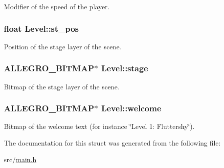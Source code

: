 Modifier of the speed of the player. \hypertarget{structLevel_ab13f799d9e2e06a04debbd97676fb512}{
\subsubsection[{st\-\_\-pos}]{\setlength{\rightskip}{0pt plus 5cm}float Level\-::st\-\_\-pos}}\label{structLevel_ab13f799d9e2e06a04debbd97676fb512}
Position of the stage layer of the scene. \hypertarget{structLevel_ad412b858a4e688114dd89a44ecb005bb}{
\subsubsection[{stage}]{\setlength{\rightskip}{0pt plus 5cm}A\-L\-L\-E\-G\-R\-O\-\_\-\-B\-I\-T\-M\-A\-P$\ast$ Level\-::stage}}\label{structLevel_ad412b858a4e688114dd89a44ecb005bb}
Bitmap of the stage layer of the scene. \hypertarget{structLevel_a575fec7686bd94b5c35b15d73296c977}{
\subsubsection[{welcome}]{\setlength{\rightskip}{0pt plus 5cm}A\-L\-L\-E\-G\-R\-O\-\_\-\-B\-I\-T\-M\-A\-P$\ast$ Level\-::welcome}}\label{structLevel_a575fec7686bd94b5c35b15d73296c977}
Bitmap of the welcome text (for instance \char`\"{}\-Level 1\-: Fluttershy\char`\"{}). 

The documentation for this struct was generated from the following file\-:\begin{DoxyCompactItemize}
\item 
src/\hyperlink{main_8h}{main.\-h}\end{DoxyCompactItemize}
